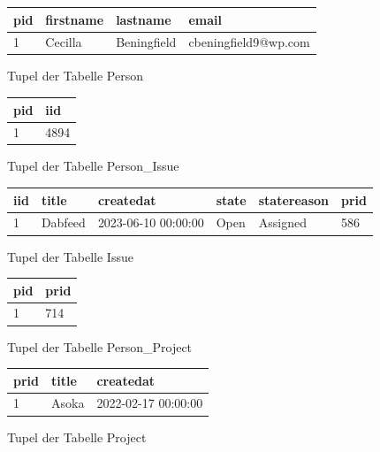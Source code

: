 \begin{figure}[H]
	\centering
	\begin{tabular}{|l | l | l | l |}
	\hline
	pid & firstname & lastname & email \\
	\hline
	1 & Cecilla & Beningfield & cbeningfield9@wp.com \\
	\hline
	\end{tabular}
	\caption{Tupel der Tabelle Person}
\end{figure}
\begin{figure}[H]
	\centering
	\begin{tabular}{|l | l |}
	\hline
	pid & iid \\
	\hline
	1 & 4894 \\
	\hline
	\end{tabular}
	\caption{Tupel der Tabelle Person\_Issue}
\end{figure}
\begin{figure}[H]
	\centering
	\begin{tabular}{|l | l | l | l | l | l|}
	\hline
	iid & title & createdat & state & statereason & prid \\
	\hline
	1 & Dabfeed & 2023-06-10 00:00:00 & Open & Assigned & 586 \\
	\hline
	\end{tabular}
	\caption{Tupel der Tabelle Issue}
\end{figure}
\begin{figure}[H]
	\centering
	\begin{tabular}{|l | l |}
	\hline
	pid & prid \\
	\hline
	1 & 714 \\
	\hline
	\end{tabular}
	\caption{Tupel der Tabelle Person\_Project}
\end{figure}
\begin{figure}[H]
	\centering
	\begin{tabular}{|l | l | l |}
	\hline
	prid & title & createdat \\
	\hline
	1 & Asoka & 2022-02-17 00:00:00 \\
	\hline
	\end{tabular}
	\caption{Tupel der Tabelle Project}
\end{figure}
\newpage


